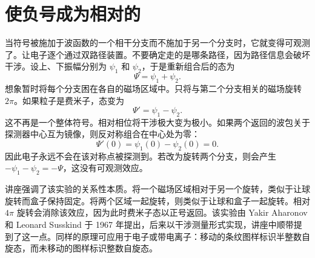 \section{使负号成为相对的}

当符号被施加于波函数的一个相干分支而不施加于另一个分支时，它就变得可观测了。让电子逐个通过双路径装置。不要确定走的是哪条路径，因为路径信息会破坏干涉。设上、下振幅分别为 \(\psi_1\) 和 \(\psi_2\)，于是重新组合后的态为
\begin{equation}
\Psi=\psi_1+\psi_2.
\end{equation}
想象暂时将每个分支困在各自的磁场区域中。只将与第二个分支相关的磁场旋转 \(2\pi\)。如果粒子是费米子，态变为
\begin{equation}
\Psi'=\psi_1-\psi_2.
\end{equation}
这不再是一个整体符号。相对相位将干涉极大变为极小。如果两个返回的波包关于探测器中心互为镜像，则反对称组合在中心处为零：
\begin{equation}
\Psi'(0)=\psi_1(0)-\psi_2(0)=0.
\end{equation}
因此电子永远不会在该对称点被探测到。若改为旋转两个分支，则会产生 \(-\psi_1-\psi_2=-\Psi\)，这没有可观测效应。

讲座强调了该实验的关系性本质。将一个磁场区域相对于另一个旋转，类似于让球旋转而盒子保持固定。将两个区域一起旋转，则类似于让球和盒子一起旋转。相对 \(4\pi\) 旋转会消除该效应，因为此时费米子态以正号返回。该实验由 Yakir Aharonov 和 Leonard Susskind 于 1967 年提出，后来以干涉测量形式实现，讲座中顺带提到了这一点。同样的原理可应用于电子或带电离子：移动的条纹图样标识半整数自旋态，而未移动的图样标识整数自旋态。

\begin{classroomqa}
\end{classroomqa}

\begin{classroomqa}
\end{classroomqa}

\begin{classroomqa}
\end{classroomqa}

